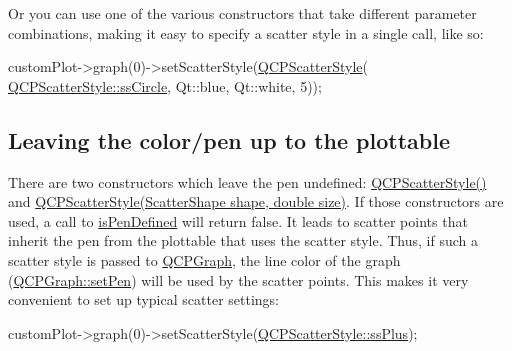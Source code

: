 Or you can use one of the various constructors that take different parameter combinations, making it easy to specify a scatter style in a single call, like so\-: 
\begin{DoxyCode}
customPlot->graph(0)->setScatterStyle(\hyperlink{class_q_c_p_scatter_style_a8836018d9ad83ccd8870de8315c1be73}{QCPScatterStyle}(
      \hyperlink{class_q_c_p_scatter_style_adb31525af6b680e6f1b7472e43859349a7c92a110880d0ef2170dff3a5b4f7779}{QCPScatterStyle::ssCircle}, Qt::blue, Qt::white, 5));
\end{DoxyCode}
\hypertarget{class_q_c_p_scatter_style_QCPScatterStyle-undefinedpen}{}\subsection{Leaving the color/pen up to the plottable}\label{class_q_c_p_scatter_style_QCPScatterStyle-undefinedpen}
There are two constructors which leave the pen undefined\-: \hyperlink{class_q_c_p_scatter_style_a8836018d9ad83ccd8870de8315c1be73}{Q\-C\-P\-Scatter\-Style()} and \hyperlink{class_q_c_p_scatter_style_a003d92f74f4561eda111862eadd62f28}{Q\-C\-P\-Scatter\-Style(\-Scatter\-Shape shape, double size)}. If those constructors are used, a call to \hyperlink{class_q_c_p_scatter_style_a7f1385a8d5e4f349a6b8030723fbd0f7}{is\-Pen\-Defined} will return false. It leads to scatter points that inherit the pen from the plottable that uses the scatter style. Thus, if such a scatter style is passed to \hyperlink{class_q_c_p_graph}{Q\-C\-P\-Graph}, the line color of the graph (\hyperlink{class_q_c_p_abstract_plottable_ab74b09ae4c0e7e13142fe4b5bf46cac7}{Q\-C\-P\-Graph\-::set\-Pen}) will be used by the scatter points. This makes it very convenient to set up typical scatter settings\-:


\begin{DoxyCode}
customPlot->graph(0)->setScatterStyle(\hyperlink{class_q_c_p_scatter_style_adb31525af6b680e6f1b7472e43859349a2d7f1d3c1a148b9d9d17f2fd9cae5eb7}{QCPScatterStyle::ssPlus});
\end{DoxyCode}



